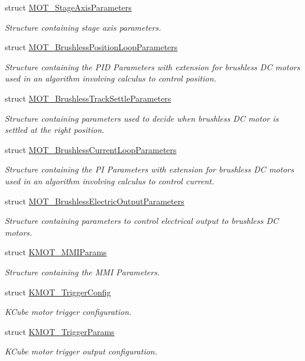 \begin{DoxyCompactItemize}
struct \hyperlink{struct_m_o_t___stage_axis_parameters}{M\+O\+T\+\_\+\+Stage\+Axis\+Parameters}
\begin{DoxyCompactList}\small\item\em Structure containing stage axis parameters. \end{DoxyCompactList}\item 
struct \hyperlink{struct_m_o_t___brushless_position_loop_parameters}{M\+O\+T\+\_\+\+Brushless\+Position\+Loop\+Parameters}
\begin{DoxyCompactList}\small\item\em Structure containing the P\+ID Parameters with extension for brushless DC motors used in an algorithm involving calculus to control position. \end{DoxyCompactList}\item 
struct \hyperlink{struct_m_o_t___brushless_track_settle_parameters}{M\+O\+T\+\_\+\+Brushless\+Track\+Settle\+Parameters}
\begin{DoxyCompactList}\small\item\em Structure containing parameters used to decide when brushless DC motor is settled at the right position. \end{DoxyCompactList}\item 
struct \hyperlink{struct_m_o_t___brushless_current_loop_parameters}{M\+O\+T\+\_\+\+Brushless\+Current\+Loop\+Parameters}
\begin{DoxyCompactList}\small\item\em Structure containing the PI Parameters with extension for brushless DC motors used in an algorithm involving calculus to control current. \end{DoxyCompactList}\item 
struct \hyperlink{struct_m_o_t___brushless_electric_output_parameters}{M\+O\+T\+\_\+\+Brushless\+Electric\+Output\+Parameters}
\begin{DoxyCompactList}\small\item\em Structure containing parameters to control electrical output to brushless DC motors. \end{DoxyCompactList}\item 
struct \hyperlink{struct_k_m_o_t___m_m_i_params}{K\+M\+O\+T\+\_\+\+M\+M\+I\+Params}
\begin{DoxyCompactList}\small\item\em Structure containing the M\+MI Parameters. \end{DoxyCompactList}\item 
struct \hyperlink{struct_k_m_o_t___trigger_config}{K\+M\+O\+T\+\_\+\+Trigger\+Config}
\begin{DoxyCompactList}\small\item\em K\+Cube motor trigger configuration. \end{DoxyCompactList}\item 
struct \hyperlink{struct_k_m_o_t___trigger_params}{K\+M\+O\+T\+\_\+\+Trigger\+Params}
\begin{DoxyCompactList}\small\item\em K\+Cube motor trigger output configuration. \end{DoxyCompactList}\end{DoxyCompactItemize}
